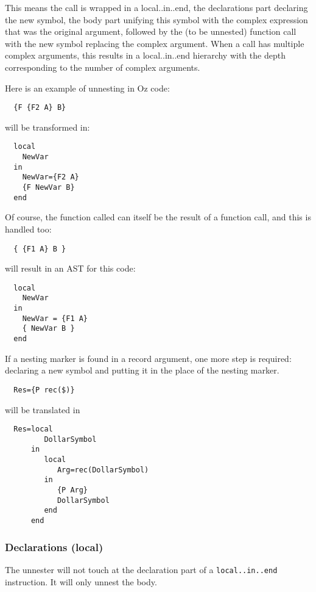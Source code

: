 \documentclass[a4paper]{memoir}
\begin{document}
 This means the call is wrapped in a local..in..end, the declarations part declaring the new symbol, the body part unifying this symbol with the complex expression that was the original argument, followed by the (to be unnested) function call with the new symbol replacing the complex argument. When a call has multiple complex arguments, this results in a local..in..end hierarchy with the depth corresponding to the number of complex arguments. %

Here is an example of unnesting in Oz code:
\begin{lstlisting}
  {F {F2 A} B}
\end{lstlisting}
will be transformed in:
\begin{lstlisting}
  local
    NewVar
  in
    NewVar={F2 A}
    {F NewVar B}
  end
\end{lstlisting}

Of course, the function called can itself be the result of a function call, and this is handled too:
\begin{lstlisting}
  { {F1 A} B }
\end{lstlisting}
will result in an AST for this code:
\begin{lstlisting}
  local
    NewVar
  in
    NewVar = {F1 A}
    { NewVar B }
  end
\end{lstlisting}

If a nesting marker is found in a record argument, one more step is required:
declaring a new symbol and putting it in the place of the nesting marker.
\begin{lstlisting}
  Res={P rec($)}
\end{lstlisting}
will be translated in
\begin{lstlisting}
  Res=local
         DollarSymbol
      in
         local 
            Arg=rec(DollarSymbol)
         in
            {P Arg}
            DollarSymbol
         end
      end
\end{lstlisting}

\subsubsection{Declarations (local)}
The unnester will not touch at the declaration part of a \lstinline!local..in..end! instruction. It will only unnest the body.
\end{document}
